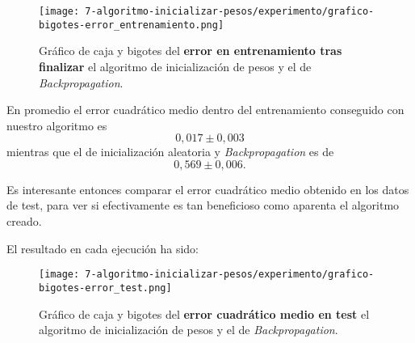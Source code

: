\begin{figure}[H]
    \centering
     \texttt{[image: 7-algoritmo-inicializar-pesos/experimento/grafico-bigotes-error\_entrenamiento.png]}
     \caption{Gráfico de caja y bigotes del \textbf{error en entrenamiento tras finalizar } el algoritmo de inicialización de pesos y el de \textit{Backpropagation}.}
     \label{img07:error-entrenamiento}
\end{figure}

En promedio el error cuadrático medio dentro del entrenamiento conseguido con nuestro algoritmo es 
\begin{equation}
    0,017 \pm 0,003
\end{equation}
mientras que el de inicialización aleatoria y \textit{Backpropagation} es de 
\begin{equation}
    0,569 \pm 0,006. 
\end{equation}

Es interesante entonces comparar el error cuadrático medio obtenido en los datos de test, para ver si efectivamente es tan beneficioso como aparenta el algoritmo creado. 

El resultado en cada ejecución ha sido: 

\begin{table}[H]
    \centering
    \caption{Error mínimo cuadrático \textbf{en test} tras finalizar las sucesivas repeticiones del algoritmo}
\end{table}


\begin{figure}[H]
    \centering
     \texttt{[image: 7-algoritmo-inicializar-pesos/experimento/grafico-bigotes-error\_test.png]}
     \caption{Gráfico de caja y bigotes del \textbf{error cuadrático medio en test } el algoritmo de inicialización de pesos y el de \textit{Backpropagation}.}
     \label{img07:error-test}
\end{figure}

